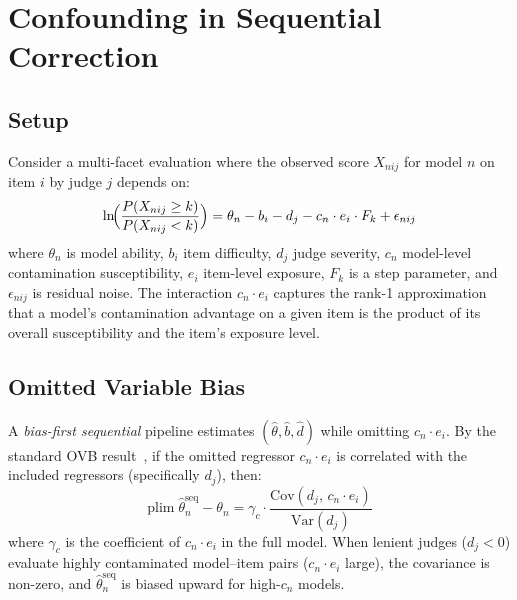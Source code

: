 \documentclass[11pt]{article}
\newcommand{\ei}{e_i}
\newcommand{\cn}{c_n}
\newcommand{\djud}{d_j}
\newcommand{\bitem}{b_i}
\begin{document}
\section{Confounding in Sequential Correction}
\label{sec:confounding}

\subsection{Setup}
Consider a multi-facet evaluation where the observed score $X_{nij}$ for model $n$ on item $i$ by judge $j$ depends on:
\begin{equation}
\label{eq:full-model}
\ln\!\Bigl(\frac{P(X_{nij} \ge k)}{P(X_{nij} < k)}\Bigr)
= \theta_n - \bitem - \djud - \cn \cdot \ei \cdot F_k + \epsilon_{nij}
\end{equation}
where $\theta_n$ is model ability, $\bitem$ item difficulty, $\djud$ judge severity, $\cn$ model-level contamination susceptibility, $\ei$ item-level exposure, $F_k$ is a step parameter, and $\epsilon_{nij}$ is residual noise. The interaction $\cn \cdot \ei$ captures the rank-1 approximation~\citep{embretson1999item} that a model's contamination advantage on a given item is the product of its overall susceptibility and the item's exposure level.

\subsection{Omitted Variable Bias}
\label{sec:ovb}

A \emph{bias-first sequential} pipeline estimates $(\hat\theta, \hat{b}, \hat{d})$ while omitting $\cn \cdot \ei$. By the standard OVB result~\citep{angrist2009mostly}, if the omitted regressor $\cn \cdot \ei$ is correlated with the included regressors (specifically $\djud$), then:
\begin{equation}
\label{eq:ovb}
\text{plim}\;\hat\theta_n^{\text{seq}} - \theta_n = \gamma_c \cdot \frac{\text{Cov}(\djud,\, \cn \cdot \ei)}{\text{Var}(\djud)}
\end{equation}
where $\gamma_c$ is the coefficient of $\cn \cdot \ei$ in the full model. When lenient judges ($\djud < 0$) evaluate highly contaminated model--item pairs ($\cn \cdot \ei$ large), the covariance is non-zero, and $\hat\theta_n^{\text{seq}}$ is biased upward for high-$\cn$ models.
\end{document}
